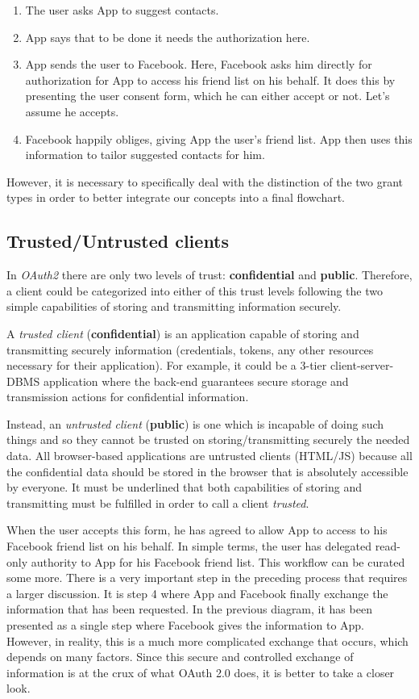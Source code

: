 \begin{enumerate}
    \item The user asks App to suggest contacts.
    \item App says that to be done it needs the authorization here.
    \item App sends the user to Facebook. Here, Facebook asks him directly for authorization for App to access his friend list on his behalf. It does this by presenting the user consent form, which he can either accept or not. Let's assume he accepts.
    \item Facebook happily obliges, giving App the user's friend list. App then uses this information to tailor suggested contacts for him.
\end{enumerate}

However, it is necessary to specifically deal with the distinction of the two grant types in order to better integrate our concepts into a final flowchart.

\subsection{Trusted/Untrusted clients}

In \textit{OAuth2} there are only two levels of trust: \textbf{confidential} and \textbf{public}. 
Therefore, a client could be categorized into either of this trust levels following the two simple capabilities of storing and transmitting information securely.

A \textit{trusted client} (\textbf{confidential}) is an application capable of storing and transmitting securely information (credentials, tokens, any other resources necessary for their application).
For example, it could be a 3-tier client-server-DBMS application where the back-end guarantees secure storage and transmission actions for confidential information. 

Instead, an \textit{untrusted client} (\textbf{public}) is one which is incapable of doing such things and so they cannot be trusted on storing/transmitting securely the needed data. All browser-based applications are untrusted clients (HTML/JS) because all the confidential data should be stored in the browser that is absolutely accessible by everyone.
It must be underlined that both capabilities of storing and transmitting must be fulfilled in order to call a client \textit{trusted}.

When the user accepts this form, he has agreed to allow App to access to his Facebook friend list on his behalf. In simple terms, the user has delegated read-only authority to App for his Facebook friend list.
This workflow can be curated some more. There is a very important step in the
preceding process that requires a larger discussion. It is step 4 where App and
Facebook finally exchange the information that has been requested. In the previous diagram, it has been presented as a single step where Facebook gives the information to App. However, in reality, this is a much more complicated exchange that occurs, which depends on many factors. Since this secure and controlled exchange of information is at the crux of what OAuth 2.0 does, it is better to take a closer look.

